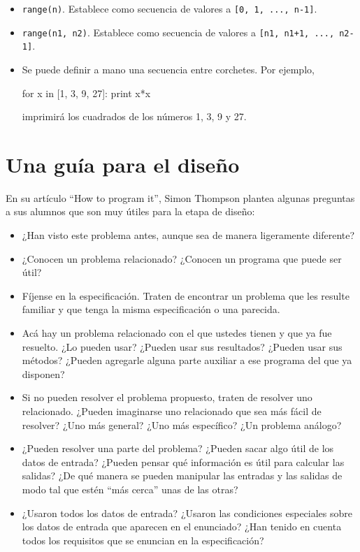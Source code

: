 \begin{itemize}
\item \lstinline!range(n)!. Establece como secuencia de valores a
 \lstinline![0, 1, ..., n-1]!.

\item \lstinline!range(n1, n2)!. Establece como secuencia de valores a
\lstinline![n1, n1+1, ..., n2-1]!.

\item Se puede definir a mano una secuencia entre corchetes. Por ejemplo,

\begin{codigo-python-sn}
for x in [1, 3, 9, 27]:
        print x*x
\end{codigo-python-sn}

imprimirá los cuadrados de los números 1, 3, 9 y 27.

\end{itemize}

\section{Una guía para el diseño}
En su artículo ``How to program it'', Simon Thompson plantea
algunas preguntas a sus alumnos que son muy útiles para la etapa
de diseño:

\begin{itemize}
\item ¿Han visto este problema antes, aunque sea de manera
ligeramente diferente?

\item ¿Conocen un problema relacionado? ¿Conocen un programa que
puede ser útil?

\item Fíjense en la especificación. Traten de encontrar un
problema que les resulte familiar y que tenga la misma
especificación o una parecida.

\item Acá hay un problema relacionado con el que ustedes tienen y que ya fue
resuelto. ¿Lo pueden usar? ¿Pueden usar sus resultados?  ¿Pueden usar sus
métodos? ¿Pueden agregarle alguna parte auxiliar a ese programa del que ya
disponen?

\item Si no pueden resolver el problema propuesto, traten de
resolver uno relacionado. ¿Pueden imaginarse uno relacionado que
sea más fácil de resolver? ¿Uno más general? ¿Uno más específico?
¿Un problema análogo?

\item ¿Pueden resolver una parte del problema?  ¿Pueden sacar algo
útil de los datos de entrada? ¿Pueden pensar qué información es
útil para calcular las salidas? ¿De qué manera se pueden manipular
las entradas y las salidas de modo tal que estén ``más cerca''
unas de las otras?

\item ¿Usaron todos los datos de entrada? ¿Usaron las condiciones
especiales sobre los datos de entrada que aparecen en el
enunciado? ¿Han tenido en cuenta todos los requisitos que se
enuncian en la especificación?

\end{itemize}

